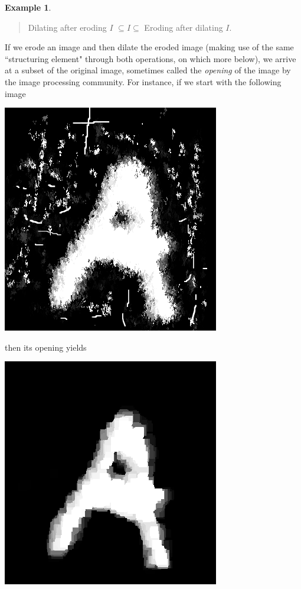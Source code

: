 \documentclass[11pt]{book}
\theoremstyle{definition}
\newtheorem{example}{Example}[section]
\theoremstyle{definition}
\theoremstyle{definition}
\theoremstyle{theorem}
\theoremstyle{definition}
\begin{document}
\begin{example}
	\begin{quote}
	\hspace*{2em} Dilating after eroding $I$ $\subseteq  I \subseteq $ Eroding after dilating $I$.	
	\end{quote}
	If we erode an image and then dilate the eroded image (making use of the same ``structuring element" through both operations, on which more below), we arrive at a subset of the original image, sometimes called the \textit{opening}  of the image by the image processing community. For instance, if we start with the following image
	\begin{center}
		\includegraphics*[scale=0.25]{LetterAWithMess.png}
	\end{center}
	then its opening yields 
	\begin{center}
		\includegraphics*[scale=0.25]{LetterAAfterOpening.png}

\end{center}
\end{example}
\end{document}
